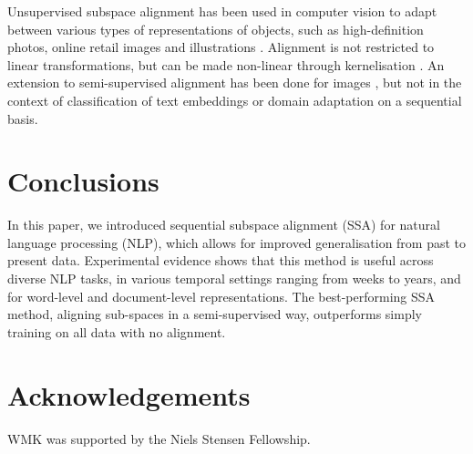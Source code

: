 \documentclass[letterpaper]{article} %
\begin{document}
Unsupervised subspace alignment has been used in computer vision to adapt between various types of representations of objects, such as high-definition photos, online retail images and illustrations \cite{fernando2013unsupervised}.%
Alignment is not restricted to linear transformations, but can be made non-linear through kernelisation \cite{aljundi2015landmarks}. %
An extension to semi-supervised alignment has been done for images \cite{yao2015semi}, but not in the context of classification of text embeddings or domain adaptation on a sequential basis. %


\section{Conclusions}

In this paper, we introduced sequential subspace alignment (SSA) for natural language processing (NLP), which allows for improved generalisation from past to present data. Experimental evidence shows that this method is useful across diverse NLP tasks, in various temporal settings ranging from weeks to years, and for word-level and document-level representations. The best-performing SSA method, aligning sub-spaces in a semi-supervised way, outperforms simply training on all data with no alignment.


\section*{Acknowledgements}
WMK was supported by the Niels Stensen Fellowship. 



\end{document}
